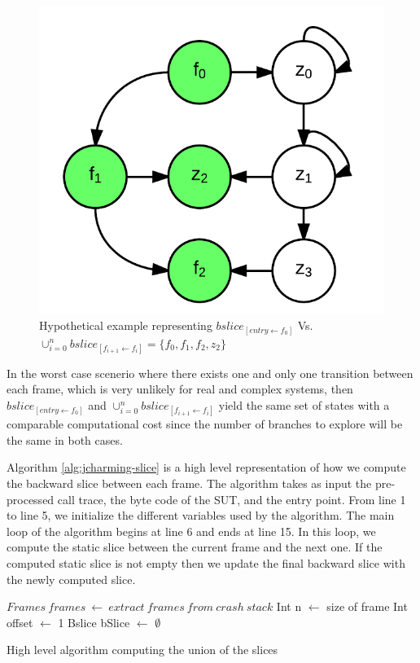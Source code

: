 \begin{figure}[h!]
  \centering
    \includegraphics{media/jcharming-slices.png}
    \caption{Hypothetical example representing $bslice_{[entry \leftarrow f_0]}$ Vs. $\cup_{i=0}^n bslice_{[f_{i+1} \leftarrow f_i]} = \{f_0 , f_1 , f_2 , z_2 \}$
    \label{fig:jcharming-slice}}
\end{figure}

In the worst case scenerio where there exists one and only one
transition between each frame, which is very unlikely for real
and complex systems, then $bslice_{[entry \leftarrow f_0]}$ and
 $\cup_{i=0}^n bslice_{[f_{i+1} \leftarrow f_i]}$ yield the same set of states with a
comparable computational cost since the number of branches
to explore will be the same in both cases.

Algorithm \ref{alg:jcharming-slice} is a high level
representation of how we compute the backward slice between
each frame. The algorithm takes as input the pre-processed
call trace, the byte code of the SUT, and the entry point. From
line 1 to line 5, we initialize the different variables used by the
algorithm. The main loop of the algorithm begins at line 6 and
ends at line 15. In this loop, we compute the static slice
between the current frame and the next one. If the computed
static slice is not empty then we update the final backward
slice with the newly computed slice.


\begin{algorithm}[H]
 $Frames~frames~\leftarrow~extract~frames~from~crash~stack$\;
 Int n $\leftarrow$ size of frame\;
 Int offset $\leftarrow$ 1\;
 Bslice bSlice $\leftarrow$ $\emptyset$\;
\caption{High level algorithm computing the union of the slices\label{alg:jcharming-slice}}
\end{algorithm}

